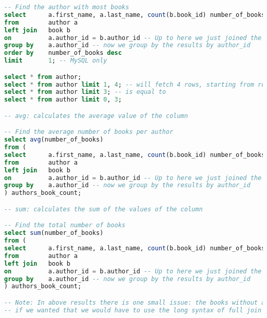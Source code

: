 \begin{lstlisting}[language=SQL]
-- Find the author with most books
select		a.first_name, a.last_name, count(b.book_id) number_of_books -- print only first, last name and number of books
from		author a
left join	book b
on			a.author_id = b.author_id -- Up to here we just joined the all authors with their books
group by	a.author_id -- now we group by the results by author_id
order by	number_of_books desc
limit		1; -- MySQL only

select * from author;
select * from author limit 1, 4; -- will fetch 4 rows, starting from row num: 1. Note: first row num is 0.
select * from author limit 3; -- is equal to
select * from author limit 0, 3;

-- avg: calculates the average value of the column

-- Find the average number of books per author
select avg(number_of_books)
from (
select		a.first_name, a.last_name, count(b.book_id) number_of_books -- print only first, last name and number of books
from		author a
left join	book b
on			a.author_id = b.author_id -- Up to here we just joined the all authors with their books
group by	a.author_id -- now we group by the results by author_id
) authors_book_count;

-- sum: calculates the sum of the values of the column

-- Find the total number of books
select sum(number_of_books)
from (
select		a.first_name, a.last_name, count(b.book_id) number_of_books -- print only first, last name and number of books
from		author a
left join	book b
on			a.author_id = b.author_id -- Up to here we just joined the all authors with their books
group by	a.author_id -- now we group by the results by author_id
) authors_book_count;

-- Note: In above results there is one small issue: the books without author are not included
-- if we wanted that we would have to use the long syntax of full join
\end{lstlisting}
